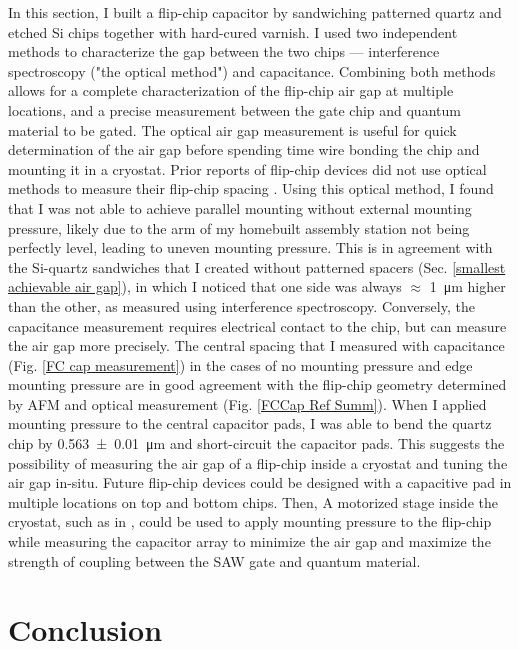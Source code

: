 \documentclass[double,12pt,1in]{beavtex}
\begin{document}
In this section, I built a flip-chip capacitor by sandwiching patterned quartz and etched Si chips together with hard-cured varnish. I used two independent methods to characterize the gap between the two chips — interference spectroscopy ("the optical method") and capacitance. Combining both methods allows for a complete characterization of the flip-chip air gap at multiple locations, and a precise measurement between the gate chip and quantum material to be gated. The optical air gap measurement is useful for quick determination of the air gap before spending time wire bonding the chip and mounting it in a cryostat. Prior reports of flip-chip devices did not use optical methods to measure their flip-chip spacing \cite{beukman_noninvasive_2015, chu_creation_2018,satzinger_quantum_2018,bennaceur_mechanical_2015}. Using this optical method, I found that I was not able to achieve parallel mounting without external mounting pressure, likely due to the arm of my homebuilt assembly station not being perfectly level, leading to uneven mounting pressure. This is in agreement with the Si-quartz sandwiches that I created without patterned spacers (Sec. \ref{smallest achievable air gap}), in which I noticed that one side was always $\approx$ \SI{1}{\micro\meter} higher than the other, as measured using interference spectroscopy. Conversely, the capacitance measurement requires electrical contact to the chip, but can measure the air gap more precisely. The central spacing that I measured with capacitance (Fig. \ref{FC cap measurement}) in the cases of no mounting pressure and edge mounting pressure are in good agreement with the flip-chip geometry determined by AFM and optical measurement (Fig. \ref{FCCap Ref Summ}). When I applied mounting pressure to the central capacitor pads, I was able to bend the quartz chip by \SI{0.563(10)}{\micro\meter} and short-circuit the capacitor pads. This suggests the possibility of measuring the air gap of a flip-chip inside a cryostat and tuning the air gap in-situ. Future flip-chip devices could be designed with a capacitive pad in multiple locations on top and bottom chips. Then, A motorized stage inside the cryostat, such as in \cite{inbar_quantum_2023}, could be used to apply mounting pressure to the flip-chip while measuring the capacitor array to minimize the air gap and maximize the strength of coupling between the SAW gate and quantum material. 


\chapter{Conclusion}
\end{document}
